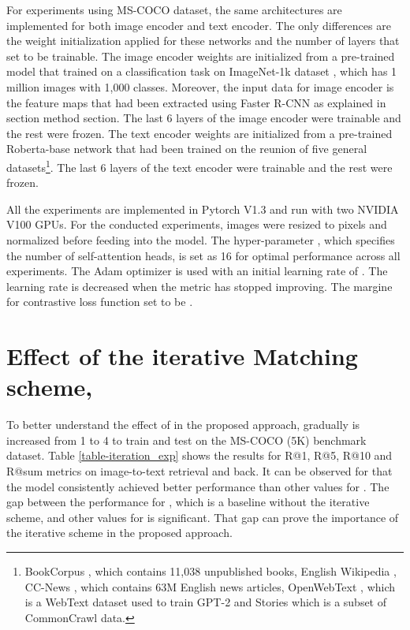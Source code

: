 \documentclass{midl}
\begin{document}
For experiments using MS-COCO dataset, the same architectures are implemented for both image encoder and text encoder. The only differences are the weight initialization applied for these networks and the number of layers that set to be trainable. The image encoder weights are initialized from a pre-trained model that trained on a classification task on ImageNet-1k dataset \cite{deng2009imagenet}, which has 1 million images with 1,000 classes. Moreover, the input data for image encoder is the feature maps that had been extracted using Faster R-CNN 
as explained in section method section. The last 6 layers of the image encoder were trainable and the rest were frozen. The text encoder weights are initialized from a pre-trained Roberta-base network that had been trained on the reunion of five general datasets\footnote{BookCorpus \cite{Homembwe2:online}, which contains 11,038 unpublished books, English Wikipedia \cite{EnglishW87:online}, CC-News \cite{NewsData24:online}, which contains 63M English news articles, OpenWebText \cite{GitHubjc79:online}, which is a WebText dataset used to train GPT-2 and Stories which is a subset of CommonCrawl \cite{NewsData14:online} data.}. The last 6 layers of the text encoder were trainable and the rest were frozen.

All the experiments are implemented in Pytorch V1.3 and run with two NVIDIA V100 GPUs. For the conducted experiments, images were resized to  pixels and normalized before feeding into the model. The hyper-parameter , which specifies the number of self-attention heads, is set as 16 for optimal performance across all experiments. The Adam optimizer \cite{kingma2014adam} is used with an initial learning rate of . The learning rate is decreased when the metric has stopped improving. The margine for contrastive loss function set to be .

\section{Effect of the iterative Matching scheme, } \label{appd} To better understand the effect of  in the proposed approach,  gradually is increased from 1 to 4 to train and test on the MS-COCO (5K) benchmark dataset. Table \ref{table-iteration_exp} shows the results for R@1, R@5, R@10 and R@sum metrics on image-to-text retrieval and back. It can be observed for  that the model consistently achieved better performance than other values for . The gap between the performance for ,  which is a baseline without the iterative scheme, and other values for  is significant. That gap can prove the importance of the iterative scheme in the proposed approach.
\end{document}
